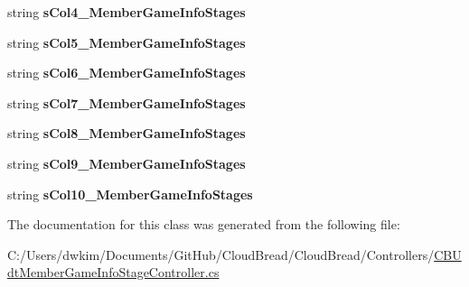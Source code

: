\begin{DoxyCompactItemize}
\item 
string {\bfseries s\+Col4\+\_\+\+Member\+Game\+Info\+Stages}\hypertarget{a00111_a5a28b6fd6eb5cf786ef0566d056997cb}{}\label{a00111_a5a28b6fd6eb5cf786ef0566d056997cb}

\item 
string {\bfseries s\+Col5\+\_\+\+Member\+Game\+Info\+Stages}\hypertarget{a00111_a21e9b8d4fc24e880b8d7b1bcd8eb7ce8}{}\label{a00111_a21e9b8d4fc24e880b8d7b1bcd8eb7ce8}

\item 
string {\bfseries s\+Col6\+\_\+\+Member\+Game\+Info\+Stages}\hypertarget{a00111_a10f13d4fde7d35cf78b8c70ec631560d}{}\label{a00111_a10f13d4fde7d35cf78b8c70ec631560d}

\item 
string {\bfseries s\+Col7\+\_\+\+Member\+Game\+Info\+Stages}\hypertarget{a00111_a44ddd954add9cd2ae951231347c6ca06}{}\label{a00111_a44ddd954add9cd2ae951231347c6ca06}

\item 
string {\bfseries s\+Col8\+\_\+\+Member\+Game\+Info\+Stages}\hypertarget{a00111_a3f5e873d4e6ba87dbfc211036325f9ce}{}\label{a00111_a3f5e873d4e6ba87dbfc211036325f9ce}

\item 
string {\bfseries s\+Col9\+\_\+\+Member\+Game\+Info\+Stages}\hypertarget{a00111_a0ae87a7bc2fe3df244e8ccd1305e9122}{}\label{a00111_a0ae87a7bc2fe3df244e8ccd1305e9122}

\item 
string {\bfseries s\+Col10\+\_\+\+Member\+Game\+Info\+Stages}\hypertarget{a00111_a3fe7595d5a83736324b535a63d628285}{}\label{a00111_a3fe7595d5a83736324b535a63d628285}

\end{DoxyCompactItemize}


The documentation for this class was generated from the following file\+:\begin{DoxyCompactItemize}
\item 
C\+:/\+Users/dwkim/\+Documents/\+Git\+Hub/\+Cloud\+Bread/\+Cloud\+Bread/\+Controllers/\hyperlink{a00230}{C\+B\+Udt\+Member\+Game\+Info\+Stage\+Controller.\+cs}\end{DoxyCompactItemize}
